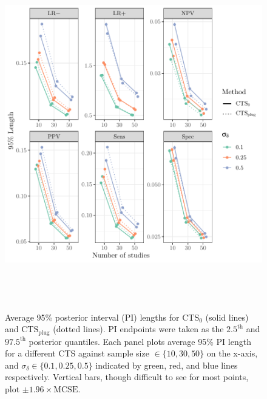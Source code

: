 \documentclass[AMA,STIX1COL]{WileyNJD-v2}
\newcommand{\CTSo}{\text{CTS}_0}
\newcommand{\CTSp}{\text{CTS}_{\text{plug}}}
\begin{document}
\begin{figure}
\includegraphics[height = 6in, width = 6in]{length_plot.pdf}
\caption{Average 95\% posterior interval (PI) lengths for $\CTSo$ (solid lines) and $\CTSp$ (dotted lines). PI endpoints were taken as the $2.5^{\text{th}}$ and $97.5^{\text{th}}$ posterior quantiles. Each panel plots average 95\% PI length for a different CTS against sample size $\in \{10, 30, 50\}$ on the x-axis, and $\sigma_{\delta} \in \{0.1, 0.25, 0.5\}$ indicated by green, red, and blue lines respectively. Vertical bars, though difficult to see for most points, plot $\pm 1.96 \times \text{MCSE}$.}
\label{fig:cts_length}
\end{figure}
\end{document}
